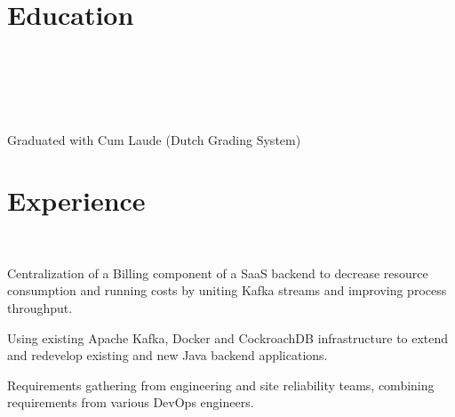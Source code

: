 \documentclass[]{deedy-resume-openfont}
\begin{document}
    
%
%


%
%

\section{Education}
\raggedright

\\ \\
    
\sectionsep

\\ \\
Graduated with Cum Laude (Dutch Grading System)\\

\sectionsep


%
%
\section{Experience}

\\ 
\begin{tightemize}
	\item Centralization of a Billing component of a SaaS backend to decrease resource consumption and running costs by uniting Kafka streams and improving process throughput.
	\item Using existing Apache Kafka, Docker and CockroachDB infrastructure to extend and redevelop existing and new Java backend applications.
	\item Requirements gathering from engineering and site reliability teams, combining requirements from various DevOps engineers.
\end{tightemize}
\end{document}
